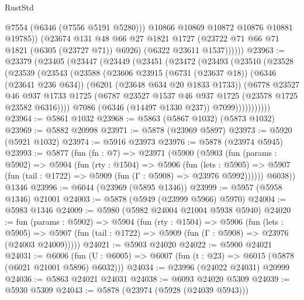 \begin{lexlean}{RustStd}
\begin{coremodule}
                  @7554
                  (@6346 (@7556 @5191 @5280)))
                @10866
                @10869
                @10872
                @10876
                @10881
                @19785))
            (@23674
              @131
              @48
              @66
              @27
              @1821
              @1727
              (@23722 @71 @66 @71 @1821 (@6305 (@23727 @71)) @6926)
              (@6322 @23611 @1537))))))
@23963 := @23379
    (@23405
      (@23447
        (@23449
          (@23451
            (@23472
              (@23493
                (@23510
                  (@23528
                    (@23539
                      (@23543
                        (@23588
                          (@23606
                            @23915
                            (@6731 (@23637 @18))
                            (@6346 (@23641 @236 @634))
                            (@6201 (@23648 @634 @20 @1833 @1733))
                            (@6778
                              @23527
                              @46
                              @937
                              @1733
                              @1725
                              (@6787 @23527 @1537 @46 @937 @1725 (@23578 @1725 @23582 @6316))))
                          @7086
                          (@6346 (@14497 @1330 @237))
                          @7099)))))))))))
@23964 := @5861 @1032
@23968 := @5863 (@5867 @1032) (@5873 @1032)
@23969 := @5882 @20998
@23971 := @5878 (@23969 @5897)
@23973 := @5920 (@5921 @1032)
@23974 := @5916 @23973
@23976 := @5878 (@23974 @5945)
@23993 := @5877
    (fun (fn : @7) =>
    @23971
      (@5900
        (@5903
          (fun (params : @5902) =>
          @5904
            (fun (rty : @1504) =>
            @5906
              (fun (lets : @5905) =>
              @5907 (fun (tail : @1722) => @5909 (fun (Γ : @5908) => @23976 @5992))))))
        @6038))
    @1346
@23996 := @6044 (@23969 (@5895 @1346))
@23999 := @5957 (@5958 @1346) @21001
@24003 := @5878 (@5949 (@23999 @5966) @5970)
@24004 := @5983 @1346
@24009 := @5980 (@5982 @24004 @21004 @5938 @5940)
@24020 := fun (params : @5902) =>
  @5904
    (fun (rty : @1504) =>
    @5906
      (fun (lets : @5905) =>
      @5907 (fun (tail : @1722) => @5909 (fun (Γ : @5908) => @23976 (@24003 @24009)))))
@24021 := @5903 @24020
@24022 := @5900 @24021
@24031 := @6006
    (fun (U : @6005) => @6007 (fun (t : @23) => @6015 (@5878 (@6021 @21001 @5896) @6032)))
@24034 := @23996 (@24022 @24031) @20999
@24036 := @5863 @24021 @24031
@24038 := @6093 @24020 @5309
@24039 := @5930 @5309
@24043 := @5878 (@23974 (@5928 (@24039 @5943)))

\end{coremodule}
\end{lexlean}
